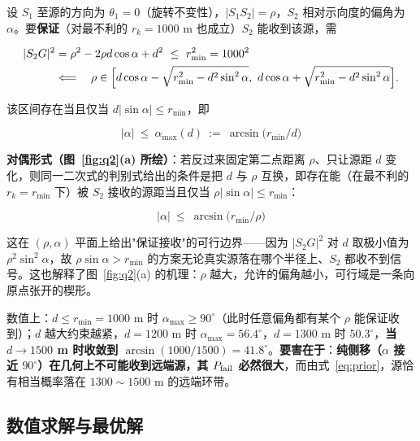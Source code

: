 设 $S_1$ 至源的方向为 $\theta_1=0$（旋转不变性），$|S_1S_2|=\rho$，$S_2$ 相对示向度的偏角为 $\alpha$。要\textbf{保证}（对最不利的 $r_k=1000$ m 也成立）$S_2$ 能收到该源，需

\begin{equation}
\begin{aligned}
|S_2G|^2&=\rho^2-2\rho d\cos\alpha+d^2\ \le\ r_{\min}^2=1000^2\\
&\Longleftarrow\quad
\rho\in\Bigl[d\cos\alpha-\sqrt{r_{\min}^2-d^2\sin^2\alpha},\ d\cos\alpha+\sqrt{r_{\min}^2-d^2\sin^2\alpha}\Bigr].
\end{aligned}
\end{equation}

该区间存在当且仅当 $d|\sin\alpha|\le r_{\min}$，即

\begin{equation}
\boxed{\ |\alpha|\ \le\ \alpha_{\max}(d)\ :=\ \arcsin\!\bigl(r_{\min}/d\bigr)\ }
\label{eq:alphamax}
\end{equation}

\textbf{对偶形式（图~\ref{fig:q2}(a) 所绘）}：若反过来固定第二点距离 $\rho$、只让源距 $d$ 变化，则同一二次式的判别式给出的条件是把 $d$ 与 $\rho$ 互换，即存在能（在最不利的 $r_k=r_{\min}$ 下）被 $S_2$ 接收的源距当且仅当 $\rho|\sin\alpha|\le r_{\min}$：

\begin{equation}
\boxed{\ |\alpha|\ \le\ \arcsin\!\bigl(r_{\min}/\rho\bigr)\ }
\label{eq:dualbound}
\end{equation}

这在 $(\rho,\alpha)$ 平面上给出"保证接收"的可行边界——因为 $|S_2G|^2$ 对 $d$ 取极小值为 $\rho^2\sin^2\alpha$，故 $\rho\sin\alpha>r_{\min}$ 的方案无论真实源落在哪个半径上、$S_2$ 都收不到信号。这也解释了图~\ref{fig:q2}(a) 的机理：$\rho$ 越大，允许的偏角越小，可行域是一条向原点张开的楔形。

数值上：$d\le r_{\min}=1000$ m 时 $\alpha_{\max}\ge90^\circ$（此时任意偏角都有某个 $\rho$ 能保证收到）；$d$ 越大约束越紧，$d=1200$ m 时 $\alpha_{\max}=56.4^\circ$，$d=1300$ m 时 $50.3^\circ$，\textbf{当 $d\to1500$ m 时收敛到 $\arcsin(1000/1500)=41.8^\circ$}。\textbf{要害在于}：\textbf{纯侧移（$\alpha$ 接近 $90^\circ$）在几何上不可能收到远端源，其 $P_{\rm fail}$ 必然很大}，而由式~\eqref{eq:prior}，源恰有相当概率落在 $1300\!\sim\!1500$ m 的远端环带。

\subsection{数值求解与最优解}

